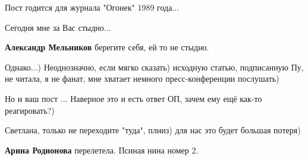 \begin{itemize}
 
Пост годится для журнала "Огонек" 1989 года...

 
Сегодня мне за Вас стыдно...

\begin{itemize}
 
\textbf{Александр Мельников} берегите себя, ей то не стыдно.
\end{itemize}

 

Однако...) Неоднозначно, если мягко сказать) исходную статью, подписанную Пу,
не читала, я не фанат, мне хватает немного пресс-конференции послушать)

Но и ваш пост ... Наверное это и есть ответ ОП, зачем ему ещё как-то
реагировать?)

Светлана, только не переходите "туда", плииз) для нас это будет большая потеря)

\begin{itemize}
 
\textbf{Арина Родионова} перелетела. Псиная нина номер 2.

 

\end{itemize}
\end{itemize}
